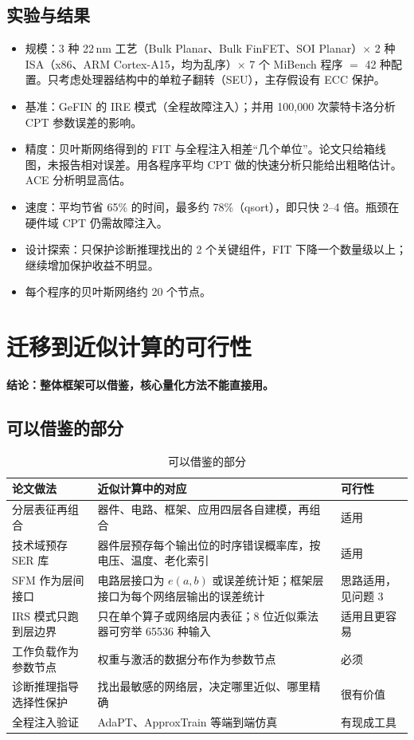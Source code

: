\documentclass[11pt,a4paper]{ctexart}
\begin{document}
\subsection{实验与结果}
\begin{itemize}[leftmargin=*]
  \item 规模：3 种 22\,nm 工艺（Bulk Planar、Bulk FinFET、SOI Planar）$\times$ 2 种 ISA（x86、ARM Cortex-A15，均为乱序）$\times$ 7 个 MiBench 程序 $=$ 42 种配置。只考虑处理器结构中的单粒子翻转（SEU），主存假设有 ECC 保护。
  \item 基准：GeFIN 的 IRE 模式（全程故障注入）；并用 100{,}000 次蒙特卡洛分析 CPT 参数误差的影响。
  \item 精度：贝叶斯网络得到的 FIT 与全程注入相差“几个单位”。论文只给箱线图，未报告相对误差。用各程序平均 CPT 做的快速分析只能给出粗略估计。ACE 分析明显高估。
  \item 速度：平均节省 65\% 的时间，最多约 78\%（qsort），即只快 2--4 倍。瓶颈在硬件域 CPT 仍需故障注入。
  \item 设计探索：只保护诊断推理找出的 2 个关键组件，FIT 下降一个数量级以上；继续增加保护收益不明显。
  \item 每个程序的贝叶斯网络约 20 个节点。
\end{itemize}

\section{迁移到近似计算的可行性}

\textbf{结论：整体框架可以借鉴，核心量化方法不能直接用。}

\subsection{可以借鉴的部分}
\begin{table}[h]
\centering
\small
\begin{tabularx}{\textwidth}{@{}XXl@{}}
\toprule
论文做法 & 近似计算中的对应 & 可行性 \\
\midrule
分层表征再组合 & 器件、电路、框架、应用四层各自建模，再组合 & 适用 \\
技术域预存 SER 库 & 器件层预存每个输出位的时序错误概率库，按电压、温度、老化索引 & 适用 \\
SFM 作为层间接口 & 电路层接口为 $e(a,b)$ 或误差统计矩；框架层接口为每个网络层输出的误差统计 & 思路适用，见问题 3 \\
IRS 模式只跑到层边界 & 只在单个算子或网络层内表征；8 位近似乘法器可穷举 65536 种输入 & 适用且更容易 \\
工作负载作为参数节点 & 权重与激活的数据分布作为参数节点 & 必须 \\
诊断推理指导选择性保护 & 找出最敏感的网络层，决定哪里近似、哪里精确 & 很有价值 \\
全程注入验证 & AdaPT、ApproxTrain 等端到端仿真 & 有现成工具 \\
\bottomrule
\end{tabularx}
\caption{可以借鉴的部分}
\end{table}
\end{document}
